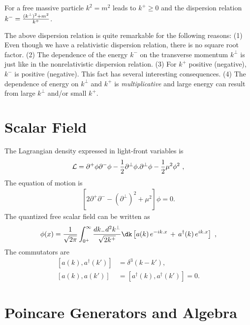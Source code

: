 \documentclass[12pt,a4paper]{report}
\begin{document}
For a free massive particle $k^2 = m^2$ leads to $
k^+ \ge 0 $ and the dispersion relation $ k^- = {(k^\perp)^2 + m^2 \over
k^+}$.


The above dispersion relation is quite remarkable for the following reasons:
(1) Even though we have a relativistic dispersion relation, there is no
square root factor. 
(2) The dependence of the energy $k^-$ on the transverse momentum
$k^\perp$ is just like in the nonrelativistic dispersion relation.
(3) For $k^+$ positive (negative), $k^-$ is positive (negative). This fact
has several interesting consequences.
(4) The dependence of energy on $k^\perp$ and $k^+$ is {\it
multiplicative} and
large energy can result from large $k^\perp$ and/or small $k^+$.  

\section{Scalar Field}
The Lagrangian density expressed in light-front variables is \cite{Harindranath}
\begin{align}
    {\cal L} =  \partial^+ \phi \partial^- \phi - { 1 \over 2}
\partial^\perp  \phi . \partial^\perp \phi - { 1 \over 2} \mu^2 \phi^2~,
\end{align}
The equation of motion is 
\begin{align}
    \left [ 2\partial^+ \partial^- - (\partial^\perp)^2 + \mu^2 \right] \phi =0.
\end{align}
The quantized free scalar field can be written as
\begin{align}
    \phi(x) =\frac{1}{\sqrt{2\pi}}  \int_{0^+}^{\infty}\frac{dk_{-}d^2k^{\perp}}{\sqrt{2k^{+}}} \dk  
\left [ a(k) \,
e^{-ik.x} \, +
\, a^{\dagger}(k) \, e^{ik.x} \right] ~,
\end{align}
The commutators are
\begin{align}
    \left [ a(k),a^{\dagger}(k')\right ] & =  \delta^3 (k-k'),
\nonumber \\
 \left [ a(k),a(k') \right ] & = 
\left [ a^{\dagger}(k),a^{\dagger}(k') \right ] = 0.
\end{align}
\section{Poincare Generators and Algebra}
\end{document}
